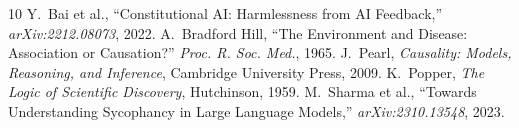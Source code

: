 \documentclass[11pt,a4paper]{article}
\begin{document}

\begin{thebibliography}{10}
 Y.~Bai et al., ``Constitutional AI: Harmlessness from AI Feedback,'' \textit{arXiv:2212.08073}, 2022.
 A.~Bradford Hill, ``The Environment and Disease: Association or Causation?'' \textit{Proc. R. Soc. Med.}, 1965.
 J.~Pearl, \textit{Causality: Models, Reasoning, and Inference}, Cambridge University Press, 2009.
 K.~Popper, \textit{The Logic of Scientific Discovery}, Hutchinson, 1959.
 M.~Sharma et al., ``Towards Understanding Sycophancy in Large Language Models,'' \textit{arXiv:2310.13548}, 2023.
\end{thebibliography}
\end{document}
